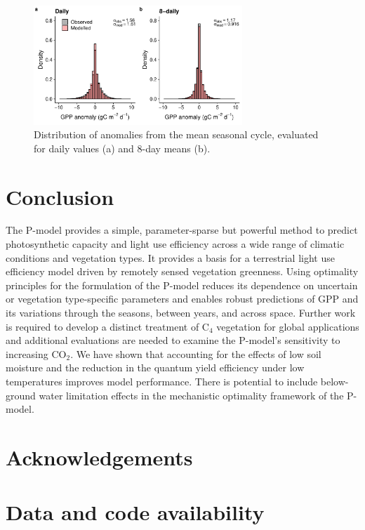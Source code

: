 \documentclass{myreport}
\newcommand{\coo}{CO$_2$}
\begin{document}
\begin{figure}[!ht]
    \centering
\includegraphics[width=0.7\textwidth]{fig/hist_anomalies.pdf}
    \caption{Distribution of anomalies from the mean seasonal cycle, evaluated for daily values (a) and 8-day means (b).} 
    \label{fig:modobs_anomalies}
\end{figure}


\section{Conclusion}

The P-model provides a simple, parameter-sparse but powerful method to predict photosynthetic capacity and light use efficiency across a wide range of climatic conditions and vegetation types. It provides a basis for a terrestrial light use efficiency model driven by remotely sensed vegetation greenness. Using optimality principles for the formulation of the P-model reduces its dependence on uncertain or vegetation type-specific parameters and enables robust predictions of GPP and its variations through the seasons, between years, and across space. Further work is required to develop a distinct treatment of C$_4$ vegetation for global applications and additional evaluations are needed to examine the P-model's sensitivity to increasing \coo . We have shown that accounting for the effects of low soil moisture and the reduction in the quantum yield efficiency under low temperatures improves model performance. There is potential to include below-ground water limitation effects in the mechanistic optimality framework of the P-model. 


\clearpage

\section{Acknowledgements}


\section{Data and code availability}
\end{document}
